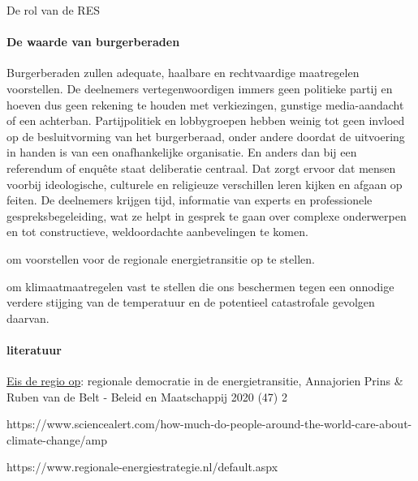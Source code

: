 \begin{voorstel}{De rol van de RES}
\begin{multicols*}{2}
\begin{overwegingen}
\paragraph{De waarde van burgerberaden}
Burgerberaden zullen adequate, haalbare en rechtvaardige maatregelen voorstellen. De deelnemers vertegenwoordigen immers geen politieke partij en hoeven dus geen rekening te houden met verkiezingen, gunstige media-aandacht of een achterban. Partijpolitiek en lobbygroepen hebben weinig tot geen invloed op de besluitvorming van het burgerberaad, onder andere doordat de uitvoering in handen is van een onafhankelijke organisatie. En anders dan bij een referendum of enquête staat deliberatie centraal. Dat zorgt ervoor dat mensen voorbij ideologische, culturele en religieuze verschillen leren kijken en afgaan op feiten. De deelnemers krijgen tijd, informatie van experts en professionele gespreksbegeleiding, wat ze helpt in gesprek te gaan over complexe onderwerpen en tot constructieve, weldoordachte aanbevelingen te komen.


\end{overwegingen}

\begin{aanbevelingen}
 om voorstellen voor de regionale energietransitie op te stellen.

 om klimaatmaatregelen vast te stellen die ons beschermen tegen een onnodige verdere stijging van de temperatuur en de potentieel catastrofale gevolgen daarvan.

\end{aanbevelingen}

\paragraph{literatuur}

\href{https://energievoordrenthe.nl/toolkit/volksvertegenwoordigers/HandlerDownloadFiles.ashx?idnv=1688984}{Eis de regio op}: regionale democratie in de energietransitie, Annajorien Prins \& Ruben van de Belt - Beleid en Maatschappij 2020 (47) 2

https://www.sciencealert.com/how-much-do-people-around-the-world-care-about-climate-change/amp

https://www.regionale-energiestrategie.nl/default.aspx


\end{multicols*}
\end{voorstel}
